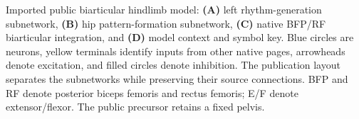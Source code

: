 Imported public biarticular hindlimb model: \textbf{(A)} left rhythm-generation subnetwork, \textbf{(B)} hip pattern-formation subnetwork, \textbf{(C)} native BFP/RF biarticular integration, and \textbf{(D)} model context and symbol key. Blue circles are neurons, yellow terminals identify inputs from other native pages, arrowheads denote excitation, and filled circles denote inhibition. The publication layout separates the subnetworks while preserving their source connections. BFP and RF denote posterior biceps femoris and rectus femoris; E/F denote extensor/flexor. The public precursor retains a fixed pelvis.
